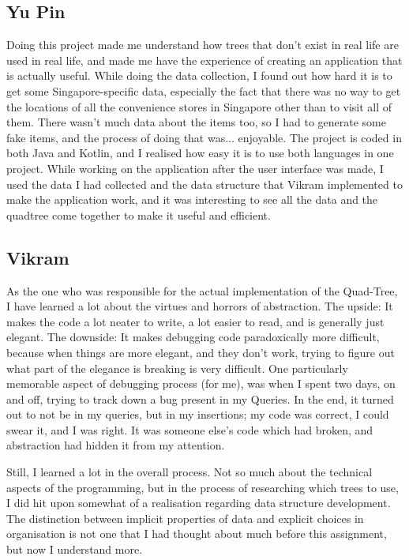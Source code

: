 \documentclass[12pt]{article}
\begin{document}
{\subsection{Yu Pin}

Doing this project made me understand how trees that don't exist in real life are used in real life, and made me have the experience of creating an application that is actually useful. While doing the data collection, I found out how hard it is to get some Singapore-specific data, especially the fact that there was no way to get the locations of all the convenience stores in Singapore other than to visit all of them. There wasn't much data about the items too, so I had to generate some fake items, and the process of doing that was... enjoyable. The project is coded in both Java and Kotlin, and I realised how easy it is to use both languages in one project. While working on the application after the user interface was made, I used the data I had collected and the data structure that Vikram implemented to make the application work, and it was interesting to see all the data and the quadtree come together to make it useful and efficient.

\subsection{Vikram}

As the one who was responsible for the actual implementation of the Quad-Tree, I have learned a lot about the virtues and horrors of abstraction. The upside: It makes the code a lot neater to write, a lot easier to read, and is generally just elegant. The downside: It makes debugging code paradoxically more difficult, because when things are more elegant, and they don't work, trying to figure out what part of the elegance is breaking is very difficult. One particularly memorable aspect of debugging process (for me), was when I spent two days, on and off, trying to track down a bug present in my Queries. In the end, it turned out to not be in my queries, but in my insertions; my code was correct, I could swear it, and I was right. It was someone else's code which had broken, and abstraction had hidden it from my attention.

Still, I learned a lot in the overall process. Not so much about the technical aspects of the programming, but in the process of researching which trees to use, I did hit upon somewhat of a realisation regarding data structure development. The distinction between implicit properties of data and explicit choices in organisation is not one that I had thought about much before this assignment, but now I understand more.

}
\end{document}
